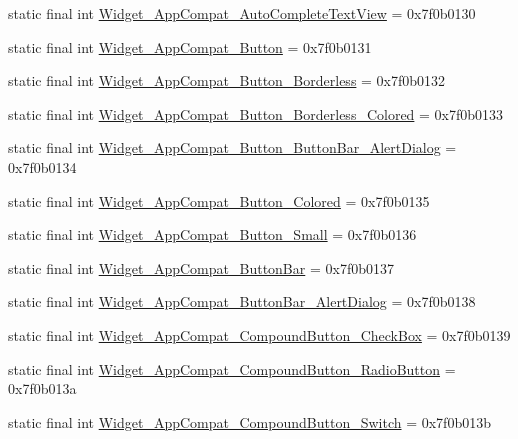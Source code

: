 \begin{CompactItemize}
\item 
static final int \hyperlink{classandroid_1_1support_1_1v4_1_1_r_1_1style_ef1b036fc0572b2199ba7d1d06149e50}{Widget\_\-AppCompat\_\-AutoCompleteTextView} = 0x7f0b0130
\item 
static final int \hyperlink{classandroid_1_1support_1_1v4_1_1_r_1_1style_e4210ab68a47c1d8549f4e13d48d4c84}{Widget\_\-AppCompat\_\-Button} = 0x7f0b0131
\item 
static final int \hyperlink{classandroid_1_1support_1_1v4_1_1_r_1_1style_652aeac50247f54dfe0077a9d8baa5d9}{Widget\_\-AppCompat\_\-Button\_\-Borderless} = 0x7f0b0132
\item 
static final int \hyperlink{classandroid_1_1support_1_1v4_1_1_r_1_1style_88d17b0060fb9f234dce2e07380069d1}{Widget\_\-AppCompat\_\-Button\_\-Borderless\_\-Colored} = 0x7f0b0133
\item 
static final int \hyperlink{classandroid_1_1support_1_1v4_1_1_r_1_1style_74b69fd12173c9efb564632a33621df3}{Widget\_\-AppCompat\_\-Button\_\-ButtonBar\_\-AlertDialog} = 0x7f0b0134
\item 
static final int \hyperlink{classandroid_1_1support_1_1v4_1_1_r_1_1style_6726813d3fedc68609f754771928bafc}{Widget\_\-AppCompat\_\-Button\_\-Colored} = 0x7f0b0135
\item 
static final int \hyperlink{classandroid_1_1support_1_1v4_1_1_r_1_1style_f35123c12d11e222dbb36664ef903ff1}{Widget\_\-AppCompat\_\-Button\_\-Small} = 0x7f0b0136
\item 
static final int \hyperlink{classandroid_1_1support_1_1v4_1_1_r_1_1style_b728964ccdb187ed481bb7affa322d54}{Widget\_\-AppCompat\_\-ButtonBar} = 0x7f0b0137
\item 
static final int \hyperlink{classandroid_1_1support_1_1v4_1_1_r_1_1style_8c293e116f7bbc693687b6f8b11e88b1}{Widget\_\-AppCompat\_\-ButtonBar\_\-AlertDialog} = 0x7f0b0138
\item 
static final int \hyperlink{classandroid_1_1support_1_1v4_1_1_r_1_1style_b0740fc9156977c912139e9138032279}{Widget\_\-AppCompat\_\-CompoundButton\_\-CheckBox} = 0x7f0b0139
\item 
static final int \hyperlink{classandroid_1_1support_1_1v4_1_1_r_1_1style_58d45c4748e06ea3873f3946c4271cf5}{Widget\_\-AppCompat\_\-CompoundButton\_\-RadioButton} = 0x7f0b013a
\item 
static final int \hyperlink{classandroid_1_1support_1_1v4_1_1_r_1_1style_41c61ceb84f0ac30920a55f3903ede99}{Widget\_\-AppCompat\_\-CompoundButton\_\-Switch} = 0x7f0b013b
\item 

\end{CompactItemize}
